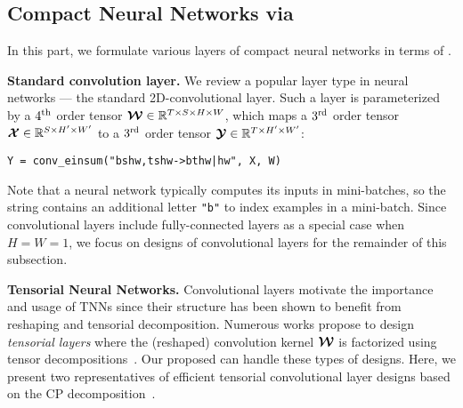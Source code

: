 \subsection{Compact Neural Networks via \conveinsum}
\label{sub:TNN}
 
In this part, we formulate various layers of compact neural networks in terms of \conveinsum.

\textbf{Standard convolution layer.} 
We review a popular layer type in neural networks --- the standard 2D-convolutional layer.
Such a layer is parameterized by a $4^{\mathrm{th}}$ order tensor $\bm{\mathcal{W}} \in \mathbb{R}^{T \times S \times H \times W}$, which maps a $3^{\mathrm{rd}}$ order tensor $\bm{\mathcal{X}} \in \mathbb{R}^{S \times H^\prime \times W^\prime}$ to a $3^{\mathrm{rd}}$ order tensor $\bm{\mathcal{Y}} \in \mathbb{R}^{T \times H^\prime \times W^\prime}$:
\begin{lstlisting}
Y = conv_einsum("bshw,tshw->bthw|hw", X, W)
\end{lstlisting}
\vspace{-1em}
Note that a neural network typically computes its inputs in mini-batches, so the \conveinsum string contains an additional letter \texttt{"b"} to index examples in a mini-batch. Since convolutional layers include fully-connected layers as a special case when $H = W = 1$, we focus on designs of convolutional layers for the remainder of this subsection.

% 

\textbf{Tensorial Neural Networks.}
Convolutional layers motivate the importance and usage of TNNs since their structure has been shown to benefit from reshaping and tensorial decomposition. Numerous works propose to design {\em tensorial layers} where the (reshaped) convolution kernel $\bm{\mathcal{W}}$ is factorized using tensor decompositions~\citep{lebedev2015speeding,kim2015compression,garipov2016ultimate,wang2017tensor,su2018tensorial}. Our proposed \conveinsum can handle these types of designs. 
Here, we present two representatives of efficient tensorial convolutional layer designs based on the CP decomposition~\citep{kolda2009tensor}.


